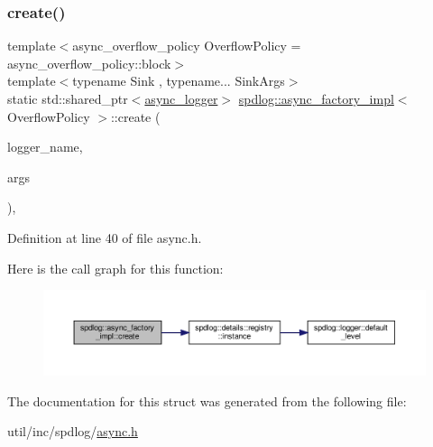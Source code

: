 \subsubsection{\texorpdfstring{create()}{create()}}
{\footnotesize\ttfamily template$<$async\+\_\+overflow\+\_\+policy Overflow\+Policy = async\+\_\+overflow\+\_\+policy\+::block$>$ \\
template$<$typename Sink , typename... Sink\+Args$>$ \\
static std\+::shared\+\_\+ptr$<$\hyperlink{classspdlog_1_1async__logger}{async\+\_\+logger}$>$ \hyperlink{structspdlog_1_1async__factory__impl}{spdlog\+::async\+\_\+factory\+\_\+impl}$<$ Overflow\+Policy $>$\+::create (\begin{DoxyParamCaption}\item[{std\+::string}]{logger\+\_\+name,  }\item[{Sink\+Args \&\&...}]{args }\end{DoxyParamCaption})\hspace{0.3cm}{\ttfamily [inline]}, {\ttfamily [static]}}



Definition at line 40 of file async.\+h.

Here is the call graph for this function\+:
\nopagebreak
\begin{figure}[H]
\begin{center}
\leavevmode
\includegraphics[width=350pt]{structspdlog_1_1async__factory__impl_aa39b4c4216d822e1788beccde29160d9_cgraph}
\end{center}
\end{figure}


The documentation for this struct was generated from the following file\+:\begin{DoxyCompactItemize}
\item 
util/inc/spdlog/\hyperlink{async_8h}{async.\+h}\end{DoxyCompactItemize}
